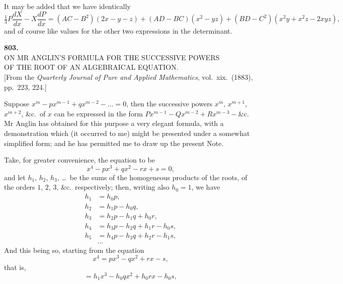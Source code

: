 \documentclass[11pt,a4paper]{article}
\begin{document}
\medskip
It may be added that we have identically
\[
\tfrac{1}{3}P\dfrac{dX}{dx} - X\dfrac{dP}{dx} = (AC - B^{2})(2x - y - z) + (AD - BC)(x^{2} - yz) + (BD - C^{2})(x^{2}y + x^{2}z - 2xyz),
\]
and of course like values for the other two expressions in the determinant.
\clearpage

\fancyhead[L]{\small 803]}
\fancyhead[C]{\small\ }

\thispagestyle{plain}
\begin{center}
\vspace*{2em}
{\Large\bfseries 803.}\\[1.5em]
{\normalsize\scshape ON MR ANGLIN'S FORMULA FOR THE SUCCESSIVE POWERS}\\[0.3em]
{\normalsize\scshape OF THE ROOT OF AN ALGEBRAICAL EQUATION.}\\[1em]
{\small [From the \textit{Quarterly Journal of Pure and Applied Mathematics}, vol.~xix.\ (1883), pp.~223, 224.]}
\end{center}

\medskip
\noindent Suppose $x^{m} - p x^{m-1} + q x^{m-2} - \ldots = 0$, then the successive powers $x^{m}$, $x^{m+1}$, $x^{m+2}$, \&c.\ of $x$ can be expressed in the form $Px^{m-1} - Qx^{m-2} + Rx^{m-3} - \&\text{c.}$  Mr Anglin has obtained for this purpose a very elegant formula, with a demonstration which (it occurred to me) might be presented under a somewhat simplified form; and he has permitted me to draw up the present Note.

\medskip
Take, for greater convenience, the equation to be
\[
x^{4} - p x^{3} + q x^{2} - r x + s = 0,
\]
and let $h_{1}$, $h_{2}$, $h_{3}$, \ldots\ be the sums of the homogeneous products of the roots, of the orders $1$, $2$, $3$, \&c.\ respectively; then, writing also $h_{0} = 1$, we have
\[
\begin{aligned}
h_{1} &= h_{0}p,\\
h_{2} &= h_{1}p - h_{0}q,\\
h_{3} &= h_{2}p - h_{1}q + h_{0}r,\\
h_{4} &= h_{3}p - h_{2}q + h_{1}r - h_{0}s,\\
h_{5} &= h_{4}p - h_{3}q + h_{2}r - h_{1}s,\\
&\ldots
\end{aligned}
\]
And this being so, starting from the equation
\[
x^{4} = px^{3} - qx^{2} + rx - s,
\]
that is,
\[
= h_{1}x^{3} - h_{0}qx^{2} + h_{0}rx - h_{0}s,
\]
\clearpage
\end{document}
